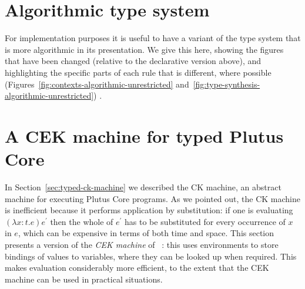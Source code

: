 \documentclass[a4paper]{article}
\begin{document}




\begin{appendices}
\section{Algorithmic type system}

For implementation purposes it is useful to have a variant of the type
system that is more algorithmic in its presentation. We give this
here, showing the figures that have been changed (relative to the
declarative version above), and highlighting the specific parts of
each rule that is different, where possible
(Figures~\ref{fig:contexts-algorithmic-unrestricted}
and~\ref{fig:type-synthesis-algorithmic-unrestricted}) .




\section{A CEK machine for typed Plutus Core}
\label{appendix:typed-cek-machine}
In Section~\ref{sec:typed-ck-machine} we described the CK machine, an
abstract machine for executing Plutus Core programs.  As we pointed
out, the CK machine is inefficient because it performs application by
substitution: if one is evaluating $(\lambda x:t.e)e^{\prime}$ then
the whole of $e^{\prime}$ has to be substituted for every occurrence
of $x$ in $e$, which can be expensive in terms of both time and space.
This section presents a version of the \textit{CEK machine} of
~\citep{Felleisen-CK-CEK}: this uses environments to store bindings of
values to variables, where they can be looked up when required. This
makes evaluation considerably more efficient, to the extent that the
CEK machine can be used in practical situations.


\end{appendices}
\end{document}
